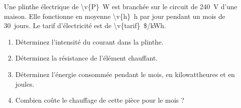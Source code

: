 Une plinthe électrique de \qty{\v{P}}{W} est branchée sur le circuit de \qty{240}{V} d'une maison. Elle fonctionne en moyenne \qty{\v{h}}{h} par jour pendant un mois de \qty{30}{jours}. Le tarif d'électricité est de \qty[minimum-decimal-digits=2]{\v{tarif}}{\$/kWh}.

\begin{enumerate}[label=\alph*)]
    \item Déterminez l'intensité du courant dans la plinthe.
    \item Déterminez la résistance de l'élément chauffant.
    \item Déterminez l'énergie consommée pendant le mois, en kilowattheures et en joules.
    \item Combien coûte le chauffage de cette pièce pour le mois ?
\end{enumerate}
